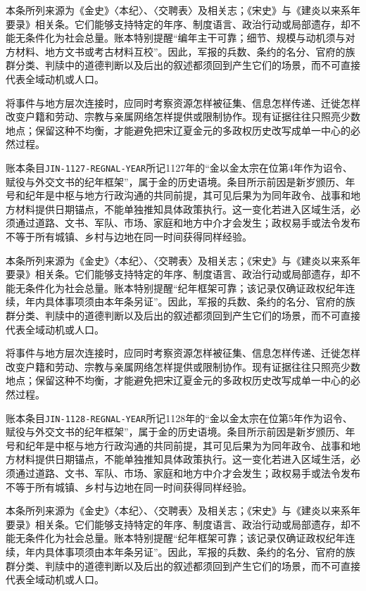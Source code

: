本条所列来源为《金史》〈本纪〉、〈交聘表〉及相关志；《宋史》与《建炎以来系年要录》相关条。它们能够支持特定的年序、制度语言、政治行动或局部遗存，却不能无条件化为社会总量。账本特别提醒“编年主干可靠；细节、规模与动机须与对方材料、地方文书或考古材料互校”。因此，军报的兵数、条约的名分、官府的族群分类、判牍中的道德判断以及后出的叙述都须回到产生它们的场景，而不可直接代表全域动机或人口。

将事件与地方层次连接时，应同时考察资源怎样被征集、信息怎样传递、迁徙怎样改变户籍和劳动、宗教与亲属网络怎样提供或限制协作。现有证据往往只照亮少数地点；保留这种不均衡，才能避免把宋辽夏金元的多政权历史改写成单一中心的必然过程。

账本条目\texttt{JIN-1127-REGNAL-YEAR}所记1127年的“金以金太宗在位第4年作为诏令、赋役与外交文书的纪年框架”，属于金的历史语境。条目所示前因是新岁颁历、年号和纪年是中枢与地方行政沟通的共同前提，其可见后果为为同年政令、战事和地方材料提供日期锚点，不能单独推知具体政策执行。这一变化若进入区域生活，必须通过道路、文书、军队、市场、家庭和地方中介才会发生；政权易手或法令发布不等于所有城镇、乡村与边地在同一时间获得同样经验。

本条所列来源为《金史》〈本纪〉、〈交聘表〉及相关志；《宋史》与《建炎以来系年要录》相关条。它们能够支持特定的年序、制度语言、政治行动或局部遗存，却不能无条件化为社会总量。账本特别提醒“纪年框架可靠；该记录仅确证政权纪年连续，年内具体事项须由本年条另证”。因此，军报的兵数、条约的名分、官府的族群分类、判牍中的道德判断以及后出的叙述都须回到产生它们的场景，而不可直接代表全域动机或人口。

将事件与地方层次连接时，应同时考察资源怎样被征集、信息怎样传递、迁徙怎样改变户籍和劳动、宗教与亲属网络怎样提供或限制协作。现有证据往往只照亮少数地点；保留这种不均衡，才能避免把宋辽夏金元的多政权历史改写成单一中心的必然过程。

账本条目\texttt{JIN-1128-REGNAL-YEAR}所记1128年的“金以金太宗在位第5年作为诏令、赋役与外交文书的纪年框架”，属于金的历史语境。条目所示前因是新岁颁历、年号和纪年是中枢与地方行政沟通的共同前提，其可见后果为为同年政令、战事和地方材料提供日期锚点，不能单独推知具体政策执行。这一变化若进入区域生活，必须通过道路、文书、军队、市场、家庭和地方中介才会发生；政权易手或法令发布不等于所有城镇、乡村与边地在同一时间获得同样经验。

本条所列来源为《金史》〈本纪〉、〈交聘表〉及相关志；《宋史》与《建炎以来系年要录》相关条。它们能够支持特定的年序、制度语言、政治行动或局部遗存，却不能无条件化为社会总量。账本特别提醒“纪年框架可靠；该记录仅确证政权纪年连续，年内具体事项须由本年条另证”。因此，军报的兵数、条约的名分、官府的族群分类、判牍中的道德判断以及后出的叙述都须回到产生它们的场景，而不可直接代表全域动机或人口。

